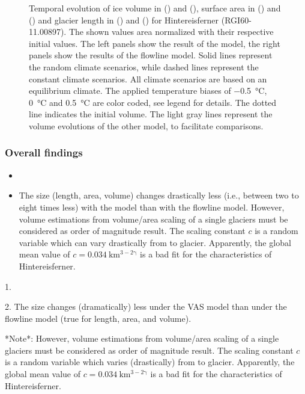 \begin{figure}[htp]
          \caption{Temporal evolution of ice volume in () and (), surface area in () and () and glacier length in () and () for Hintereisferner (RGI60-11.00897). The shown values area normalized with their respective initial values. The left panels show the result of the \vas{} model, the right panels show the results of the flowline model. Solid lines represent the random climate scenarios, while dashed lines represent the constant climate scenarios. All climate scenarios are based on an equilibrium climate. The applied temperature biases of \SI{-.5}{\celsius}, \SI{0}{\celsius} and \SI{+.5}{\celsius} are color coded, see legend for details. The dotted line indicates the initial volume. The light gray lines represent the volume evolutions of the other model, to facilitate comparisons.}
          \label{fig:hintereisferner}
        \end{figure}
      

      \subsubsection*{Overall findings}

      \begin{itemize}
        \item 
        \item The size (length, area, volume) changes drastically less (i.e., between two to eight times less) with the \vas{} model than with the flowline model.
        However, volume estimations from volume/area scaling of a single glaciers must be considered as order of magnitude result. The scaling constant $c$ is a random variable which can vary drastically from to glacier. Apparently, the global mean value of $c=0.034\ \mathrm{km^{3-2\gamma}}$ is a bad fit for the characteristics of Hintereisferner.
      \end{itemize}
      

      1. 

      2. The size changes (dramatically) less under the VAS model than under the flowline model (true for length, area, and volume).

         *Note*: However, volume estimations from volume/area scaling of a single glaciers must be considered as order of magnitude result. The scaling constant $c$ is a random variable which varies (drastically) from to glacier. Apparently, the global mean value of $c=0.034\ \mathrm{km^{3-2\gamma}}$ is a bad fit for the characteristics of Hintereisferner.

